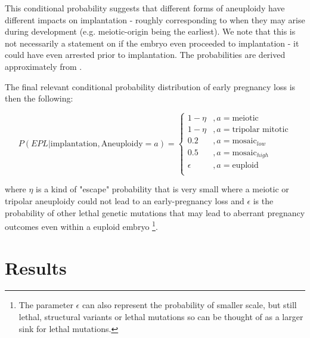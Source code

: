 \documentclass{article}
\begin{document}


This conditional probability suggests that different forms of aneuploidy have different impacts on implantation - roughly corresponding to when they may arise during development (e.g. meiotic-origin being the earliest). We note that this is not necessarily a statement on if the embryo even proceeded to implantation - it could have even arrested prior to implantation. The probabilities are derived approximately from \citep{McCoy2023-dg}.


The final relevant conditional probability distribution of early pregnancy loss is then the following: 

\begin{equation}
	P(EPL | \text{implantation}, \text{Aneuploidy}=a) = \begin{cases}
	1 - \eta &, a = \text{meiotic}\\
	1 - \eta &, a = \text{tripolar mitotic}\\
	0.2 &, a = \text{mosaic}_{low}\\
	0.5 &, a = \text{mosaic}_{high}\\
	\epsilon &, a = \text{euploid}\\
	\end{cases}
\end{equation}

where $\eta$ is a kind of "escape" probability that is very small where a meiotic or tripolar aneuploidy could not lead to an early-pregnancy loss and $\epsilon$ is the probability of other lethal genetic mutations that may lead to aberrant pregnancy outcomes even within a euploid embryo \footnote{The parameter $\epsilon$ can also represent the probability of smaller scale, but still lethal, structural variants or lethal mutations so can be thought of as a larger sink for lethal mutations.}.


\section*{Results}







\end{document}
